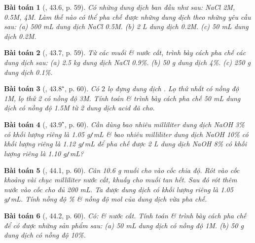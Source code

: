 \documentclass{article}
\newtheorem{baitoan}{Bài toán}
\begin{document}
\begin{baitoan}[\cite{SBT_Hoa_Hoc_8}, 43.6, p. 59]
	Có những dung dịch ban đầu như sau: \emph{NaCl 2M,  0.5M,  4M}. Làm thế nào có thể pha chế được những dung dịch theo những yêu cầu sau: (a) \emph{500 mL} dung dịch \emph{NaCl 0.5M}. (b) \emph{2 L} dung dịch \emph{ 0.2M}. (c) \emph{50 mL} dung dịch \emph{ 0.2M}.
\end{baitoan}

\begin{baitoan}[\cite{SBT_Hoa_Hoc_8}, 43.7, p. 59]
	Từ các muối \& nước cất, trình bày cách pha chế các dung dịch sau: (a) \emph{2.5 kg} dung dịch \emph{NaCl 0.9\%}. (b) \emph{50 g} dung dịch \emph{ 4\%}. (c) \emph{250 g} dung dịch \emph{ 0.1\%}.
\end{baitoan}

\begin{baitoan}[\cite{SBT_Hoa_Hoc_8}, $43.8^\star$, p. 60]
	Có $2$ lọ đựng dung dịch \emph{}. Lọ thứ nhất có nồng độ \emph{1M}, lọ thứ 2 có nồng độ \emph{3M}. Tính toán \& trình bày cách pha chế \emph{50 mL} dung dịch \emph{} có nồng độ \emph{1.5M} từ 2 dung dịch acid đã cho.
\end{baitoan}

\begin{baitoan}[\cite{SBT_Hoa_Hoc_8}, $43.9^\star$, p. 60]
	Cần dùng bao nhiêu milliliter dung dịch \emph{NaOH 3\%} có khối lượng riêng là \emph{1.05 g\texttt{/}mL} \& bao nhiêu milliliter dung dịch \emph{NaOH 10\%} có khối lượng riêng là \emph{1.12 g\texttt{/}mL} để pha chế được \emph{2 L} dung dịch \emph{NaOH 8\%} có khối lượng riêng là \emph{1.10 g\texttt{/}mL?}
\end{baitoan}

\begin{baitoan}[\cite{SBT_Hoa_Hoc_8}, 44.1, p. 60]
	Cân \emph{10.6 g} muối \emph{} cho vào cốc chia độ. Rót vào cốc khoảng vài chục milliliter nước cất, khuấy cho muối tan hết. Sau đó rót thêm nước vào cốc cho đủ \emph{200 mL}. Ta được dung dịch \emph{} có khối lượng riêng là \emph{1.05 g\texttt{/}mL}. Tính nồng độ \% \& nồng độ mol của dung dịch vừa pha chế.
\end{baitoan}

\begin{baitoan}[\cite{SBT_Hoa_Hoc_8}, 44.2, p. 60]
	Có: \emph{} \& nước cất. Tính toán \& trình bày cách pha chế để có được những sản phẩm sau: (a) \emph{50 mL} dung dịch \emph{} có nồng độ \emph{1M}. (b) \emph{50 g} dung dịch \emph{} có nồng độ \emph{10\%}.
\end{baitoan}
\end{document}
